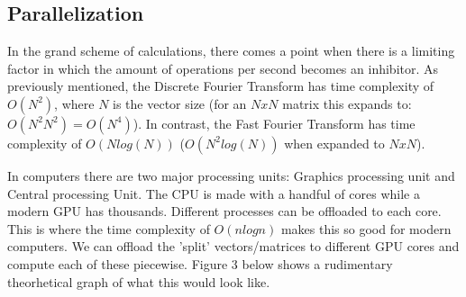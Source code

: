 \documentclass{article}
\begin{document}
\begin{center}
    \section{Parallelization}    
    \end{center}
    
    \begin{sloppypar}
        \indent{} In the grand scheme of calculations, there comes a point when there is a limiting factor in which the amount of operations per second becomes an inhibitor. As previously mentioned, the Discrete Fourier Transform has time complexity of $O(N^2)$, where $N$ is the vector size (for an $NxN$ matrix this expands to: $O(N^2N^2) = O(N^4)$). In contrast, the Fast Fourier Transform has time complexity of $O(Nlog(N))$ ($O(N^2log(N))$ when expanded to $NxN$).
    \end{sloppypar}
    \vspace{2mm}
    \begin{sloppypar}
        \indent{}In computers there are two major processing units: Graphics processing unit and Central processing Unit. The CPU is made with a handful of cores while a modern GPU has thousands. Different processes can be offloaded to each core.
        This is where the time complexity of $O(nlogn)$ makes this so good for modern computers. We can offload the 'split' vectors/matrices to different GPU cores and compute each of these piecewise. Figure 3 below shows a rudimentary theorhetical graph of what this would look like. 
    \end{sloppypar}
\end{document}

